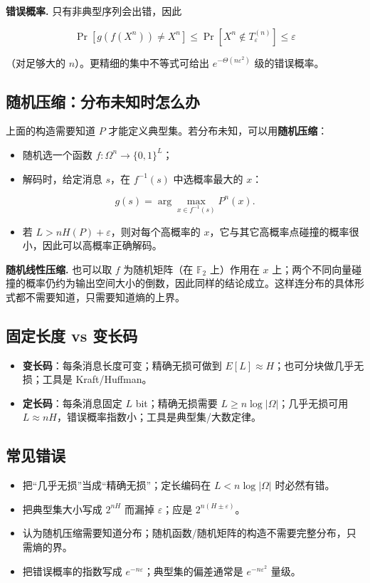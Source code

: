 \textbf{错误概率.} 只有非典型序列会出错，因此

\[
\Pr[g(f(X^n))\ne X^n]
\le\Pr[X^n\notin T_\varepsilon^{(n)}]
\le\varepsilon
\]

（对足够大的 $n$）。更精细的集中不等式可给出 $e^{-\Theta(n\varepsilon^2)}$ 级的错误概率。

\subsection{随机压缩：分布未知时怎么办}


上面的构造需要知道 $P$ 才能定义典型集。若分布未知，可以用\textbf{随机压缩}：

\begin{itemize}
\item 随机选一个函数 $f:\Omega^n\to\{0,1\}^L$；
\item 解码时，给定消息 $s$，在 $f^{-1}(s)$ 中选概率最大的 $x$：
\end{itemize}

\[
  g(s)=\arg\max_{x\in f^{-1}(s)}P^n(x).
\]
\begin{itemize}
\item 若 $L>nH(P)+\varepsilon$，则对每个高概率的 $x$，它与其它高概率点碰撞的概率很小，因此可以高概率正确解码。
\end{itemize}


\textbf{随机线性压缩.} 也可以取 $f$ 为随机矩阵（在 $\mathbb F_2$ 上）作用在 $x$ 上；两个不同向量碰撞的概率仍约为输出空间大小的倒数，因此同样的结论成立。这样连分布的具体形式都不需要知道，只需要知道熵的上界。

\subsection{固定长度 vs 变长码}


\begin{itemize}
\item \textbf{变长码}：每条消息长度可变；精确无损可做到 $E[L]\approx H$；也可分块做几乎无损；工具是 Kraft/Huffman。
\item \textbf{定长码}：每条消息固定 $L$ bit；精确无损需要 $L\ge n\log|\Omega|$；几乎无损可用 $L\approx nH$，错误概率指数小；工具是典型集/大数定律。
\end{itemize}


\subsection{常见错误}


\begin{itemize}
\item 把“几乎无损”当成“精确无损”；定长编码在 $L<n\log|\Omega|$ 时必然有错。
\item 把典型集大小写成 $2^{nH}$ 而漏掉 $\varepsilon$；应是 $2^{n(H\pm\varepsilon)}$。
\item 认为随机压缩需要知道分布；随机函数/随机矩阵的构造不需要完整分布，只需熵的界。
\item 把错误概率的指数写成 $e^{-n\varepsilon}$；典型集的偏差通常是 $e^{-n\varepsilon^2}$ 量级。
\end{itemize}
